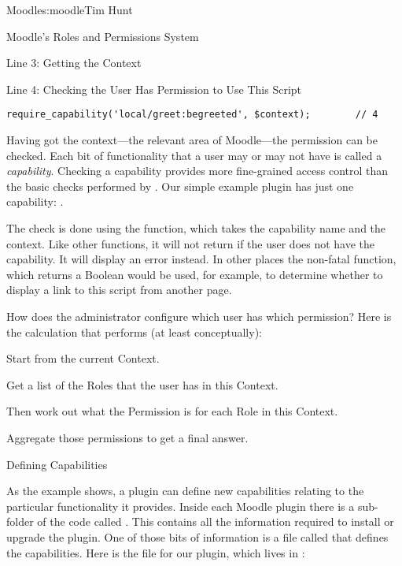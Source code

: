 \begin{aosachapter}{Moodle}{s:moodle}{Tim Hunt}
\begin{aosasect1}{Moodle's Roles and Permissions System}
\begin{aosasect2}{Line 3: Getting the Context}
\end{aosasect2}

\begin{aosasect2}{Line 4: Checking the User Has Permission to Use This Script}

\begin{verbatim}
require_capability('local/greet:begreeted', $context);        // 4
\end{verbatim}

Having got the context---the relevant area of Moodle---the permission can be checked. Each
bit of functionality that a user may or may not have is
called a \emph{capability}. Checking a capability provides more fine-grained
access control than the basic checks performed by
. Our simple example plugin has just one
capability: .

The check is done using the  function, which
takes the capability name and the context. Like other
 functions, it will not return if the user
does not have the capability. It will display an error instead. In
other places the non-fatal 
function, which returns a Boolean would be used, for example, to
determine whether to display a link to this script from another page.

How does the administrator configure which user has which permission?
Here is the calculation that  performs (at least
conceptually):

\begin{aosaenumerate}

\item Start from the current Context.

\item Get a list of the Roles that the user has in this Context.

\item Then work out what the Permission is for each Role in this
  Context.

\item Aggregate those permissions to get a final answer.

\end{aosaenumerate}

\end{aosasect2}

\begin{aosasect2}{Defining Capabilities}

As the example shows, a plugin can define new capabilities relating
to the particular functionality it provides. Inside each Moodle
plugin there is a sub-folder of the code called . This
contains all the information required to install or upgrade the
plugin. One of those bits of information is a file called
 that defines the capabilities. Here is the
 file for our plugin, which lives in
:


\end{aosasect2}
\end{aosasect1}
\end{aosachapter}
